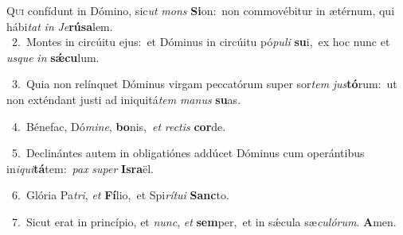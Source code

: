 \lettrine{\initial\textcolor{\initialcolor}{Q}}{ui} confídunt in Dómino, sic\textit{ut} \textit{mons} \textbf{Si}\-on:~\star non commovébitur in ætérnum, qui hábi\textit{tat} \textit{in} \textit{Je}\-\textbf{rú}\textbf{sa}lem.\\
{\numbfont\textcolor{\numbcolor}{~2.}}~Montes in circúitu ejus:~\dagger et Dóminus in circúitu pó\-\textit{pu}\-\textit{li} \textbf{su}\-i,~\star ex hoc nunc et \textit{us}\-\textit{que} \textit{in} \textbf{sǽ}\-\textbf{cu}lum.\par
{\numbfont\textcolor{\numbcolor}{~3.}}~Quia non relínquet Dóminus virgam peccatórum super sor\textit{tem} \textit{jus}\-\textbf{tó}rum:~\star ut non exténdant justi ad iniquitá\textit{tem} \textit{ma}\-\textit{nus} \textbf{su}\-as.\par
{\numbfont\textcolor{\numbcolor}{~4.}}~Bénefac, Dó\-\textit{mi}\-\textit{ne}, \textbf{bo}\-nis,~\star \textit{et} \textit{rec}\-\textit{tis} \textbf{cor}\-de.\par
{\numbfont\textcolor{\numbcolor}{~5.}}~Declinántes autem in obligatiónes addúcet Dóminus cum operántibus in\-\textit{i}\-\textit{qui}\textbf{tá}tem:~\star \textit{pax} \textit{su}\-\textit{per} \textbf{Is}\-\textbf{ra}ël.\par
{\numbfont\textcolor{\numbcolor}{~6.}}~Glória Pa\-\textit{tri}\-, \textit{et} \textbf{Fí}\-lio,~\star et Spi\-\textit{rí}\-\textit{tu}\textit{i} \textbf{Sanc}\-to.\par
{\numbfont\textcolor{\numbcolor}{~7.}}~Sicut erat in princípio, et \textit{nunc}\-, \textit{et} \textbf{sem}\-per,~\star et in sǽcula sæ\-\textit{cu}\-\textit{ló}\textit{rum}. \textbf{A}\-men.\par
